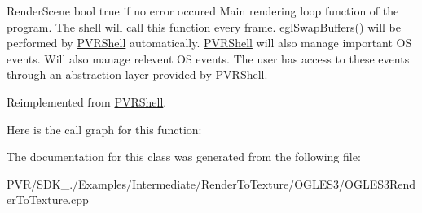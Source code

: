   Render\+Scene  bool true if no error occured  Main rendering loop function of the program. The shell will call this function every frame. egl\+Swap\+Buffers() will be performed by \hyperlink{class_p_v_r_shell}{P\+V\+R\+Shell} automatically. \hyperlink{class_p_v_r_shell}{P\+V\+R\+Shell} will also manage important O\+S events. Will also manage relevent O\+S events. The user has access to these events through an abstraction layer provided by \hyperlink{class_p_v_r_shell}{P\+V\+R\+Shell}. 

Reimplemented from \hyperlink{class_p_v_r_shell_ae0eb5f797cbe993a22b8659f9c332578}{P\+V\+R\+Shell}.



Here is the call graph for this function\+:




The documentation for this class was generated from the following file\+:\begin{DoxyCompactItemize}
\item 
P\+V\+R/\+S\+D\+K\+\_./\+Examples/\+Intermediate/\+Render\+To\+Texture/\+O\+G\+L\+E\+S3/O\+G\+L\+E\+S3\+Render\+To\+Texture.\+cpp\end{DoxyCompactItemize}

